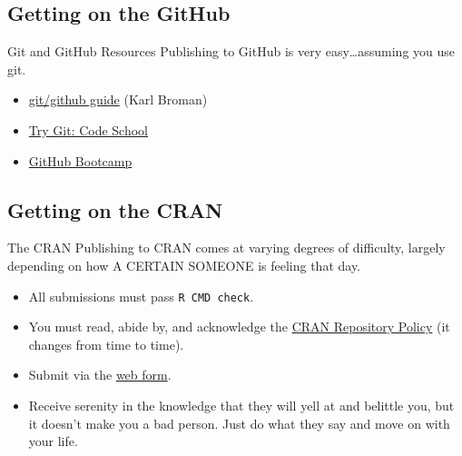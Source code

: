 \subsection{Getting on the GitHub}

\begin{frame}
  \begin{block}{Git and GitHub Resources}
  Publishing to GitHub is very easy\dots assuming you use git.
  
    \begin{itemize}
      \item \href{http://kbroman.org/github_tutorial}{git/github guide} (Karl 
Broman)
      \item \href{https://try.github.io/}{Try Git: Code School}
      \item \href{https://help.github.com/categories/54/articles}{GitHub 
Bootcamp}
    \end{itemize}
  \end{block}
\end{frame}



\subsection{Getting on the CRAN}
\makesubcontentsslidessec


\begin{frame}
  \begin{block}{The CRAN}
  Publishing to CRAN comes at varying degrees of difficulty, largely depending 
on how A CERTAIN SOMEONE is feeling that day.

    \begin{itemize}
      \item All submissions must pass \texttt{R CMD check}. \pause
      \item You must read, abide by, and acknowledge the  \pause
\href{http://cran.r-project.org/web/packages/policies.html}{CRAN Repository 
Policy} (it changes from time to time). \pause
      \item Submit via the \href{http://cran.r-project.org/submit.html}{web 
form}. \pause
      \item Receive serenity in the knowledge that they will yell at and 
belittle you, but it doesn't make you a bad person.  Just do what they say and 
move on with your life.
    \end{itemize}
  \end{block}
\end{frame}



